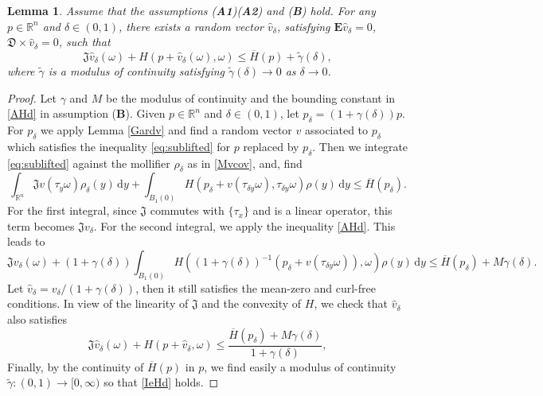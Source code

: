 \documentclass[11pt,reqno]{amsart}
\newtheorem{lem}[thm]{Lemma}
\theoremstyle{definition}
\theoremstyle{remark}
\numberwithin{equation}{section}
\newcommand{\R}{{\mathbb{R}}}
\newcommand{\dd}{\mathrm{d}}
\begin{document}
\begin{lem}\label{Appv}
Assume that the assumptions {\upshape({\bf A1})({\bf A2})} and {\upshape({\bf B})} hold. For any $p\in \R^n$ and $\delta \in (0,1)$, there exists a random vector $\hat{v}_{\delta}$, satisfying $\mathbf{E}\hat{v}_{\delta} = 0$, $\mathfrak{D}\times \hat{v}_{\delta} = 0$, such that
\begin{equation}\label{IeHd}
    \mathfrak{J}\hat{v}_{\delta}(\omega) + H(p + \hat{v}_{\delta}(\omega), \omega) \leq \overline{H}(p) + \widetilde\gamma(\delta),
\end{equation}
where $\widetilde\gamma$ is a modulus of continuity satisfying $\widetilde\gamma(\delta)\to 0$ as $\delta\to 0$.
\end{lem}
\begin{proof} Let $\gamma$ and $M$ be the modulus of continuity and the bounding constant in \eqref{AHd} in assumption ({\bf B}). Given $p \in \R^n$ and $\delta\in (0,1)$, let $p_\delta = (1+\gamma(\delta))p$. For $p_\delta$ we apply Lemma \ref{Gardv} and find a random vector $v$ associated to $p_\delta$ which satisfies the inequality \eqref{eq:sublifted} for $p$ replaced by $p_\delta$. Then we integrate \eqref{eq:sublifted} against the mollifier $\rho_\delta$ as in \eqref{Mvcov}, and, find
\begin{equation*}
     \int_{\R^n} \mathfrak{J} v(\tau_y \omega) \rho_\delta(y)\,\dd y + \int_{B_1(0)}H(p_\delta + v(\tau_{\delta y}\omega), \tau_{\delta y}\omega)\rho(y)\,\mathrm{d}y \leq \overline{H}(p_\delta).
\end{equation*}
For the first integral, since $\mathfrak{J}$ commutes with $\{\tau_x\}$ and is a linear operator, this term becomes $\mathfrak{J}v_\delta$. For the second integral, we apply the inequality \eqref{AHd}. This leads to
\begin{equation*}
    \mathfrak{J} v_{\delta}(\omega) + (1+\gamma(\delta))\int_{B_1(0)}H((1+\gamma(\delta))^{-1}(p_\delta + v(\tau_{\delta y}\omega)), \omega)\rho(y)\,\mathrm{d}y \leq \overline{H}(p_\delta) + M\gamma(\delta).
\end{equation*}
Let $\hat{v}_{\delta}= v_{\delta}/(1+ \gamma(\delta))$, then it still satisfies the mean-zero and curl-free conditions. In view of the linearity of $\mathfrak{J}$ and the convexity of $H$, we check that $\hat{v}_{\delta}$ also satisfies
\begin{equation*}
    \mathfrak{J}\hat{v}_{\delta}(\omega) + H(p + \hat{v}_{\delta}, \omega) \leq \frac{\overline{H}(p_\delta) + M\gamma(\delta)}{1+\gamma(\delta)},
\end{equation*}
Finally, by the continuity of $\overline{H}(p)$ in $p$, we find easily a modulus of continuity $\widetilde\gamma: (0,1)\to [0,\infty)$ so that \eqref{IeHd} holds.
\end{proof}
\end{document}
